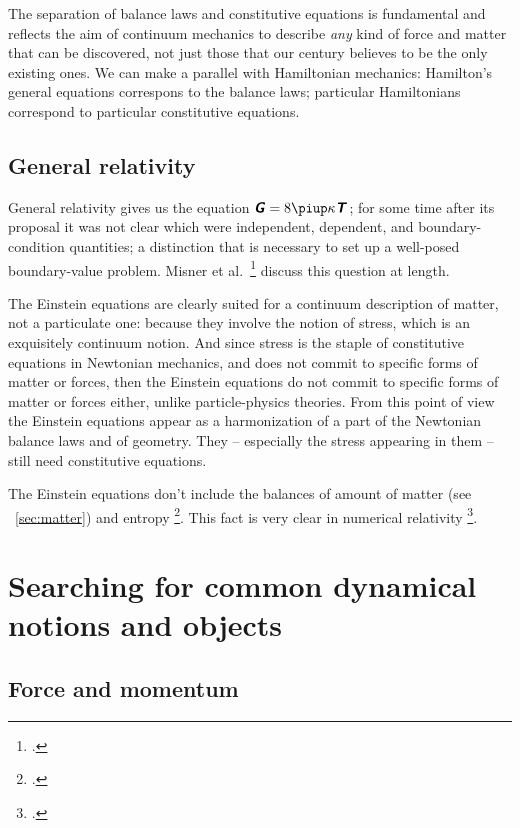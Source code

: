 \documentclass[\ifafour a4paper,12pt,\else a5paper,10pt,\fi%
onecolumn,oneside,article,%
british%
]{memoir}
\theoremstyle{remark}
\theoremstyle{innote}
\newcommand*{\mathte}[1]{\textbf{\textit{\textsf{#1}}}}
\newcommand*{\citep}{\footcites}
\newcommand*{\citey}{\footcites}%
\newcommand*{\pu}{\piup}%
\renewcommand*{\|}[1][]{\nonscript\,#1\vert\nonscript\;\mathopen{}}
\newcommand*{\sect}{\S}%
\newcommand*{\chap}{ch.}%
\newcommand*{\etal}{{et al.}}
\newcommand*{\puzzle}{{\fontencoding{U}\fontfamily{fontawesometwo}\selectfont\symbol{225}}}
\newcommand*{\psect}{{\footnotesize\puzzle}}%
\newcommand*{\yGG}{G}
\newcommand*{\yG}{\mathte{\yGG}}
\newcommand*{\yTTf}{T}
\newcommand*{\yTf}{\mathte{\yTTf}}
\begin{document}
The separation of balance laws and constitutive equations is fundamental
and reflects the aim of continuum mechanics to describe \emph{any} kind of
force and matter that can be discovered, not just those that our century
believes to be the only existing ones. We can make a parallel with
Hamiltonian mechanics: Hamilton's general equations correspons to the
balance laws; particular Hamiltonians correspond to particular constitutive
equations.



\subsection{General relativity}
\label{sec:aims_general_rel}

General relativity gives us the equation $\yG= 8\pu\kappa\yTf$; for some time
after its proposal it was not clear which were independent, dependent, and
boundary-condition quantities; a distinction that is necessary to set up a
well-posed boundary-value problem. Misner \etal\
\citey[\chap~21]{misneretal1970_r1973} discuss this question at length.

The Einstein equations are clearly suited for a continuum description of
matter, not a particulate one: because they involve the notion of stress,
which is an exquisitely continuum notion. And since stress is the staple of
constitutive equations in Newtonian mechanics, and does not commit to
specific forms of matter or forces, then the Einstein equations do not
commit to specific forms of matter or forces either, unlike
particle-physics theories. From this point of view the Einstein equations
appear as a harmonization of a part of the Newtonian balance laws and of
geometry. They -- especially the stress appearing in them -- still need
constitutive equations.

The Einstein equations don't include the balances of amount of matter (see
\psect~\ref{sec:matter}) and entropy
\citep{eckart1940c}[\chap~22]{misneretal1970_r1973}. This fact is very
clear in numerical relativity
\citep[p.~1918]{disconzi2014}[\sect~2.2]{wilsonetal2003_r2007}[\sect~6.3.2]{gourgoulhon2007_r2012}[\chap~5]{baumgarteetal2010}[\sect~2.3]{rezzollaetal2013}.

\section{Searching for common dynamical notions and objects}
\label{sec:search_common_dyn}

\subsection{Force and momentum}
\label{sec:force_momentum}
\end{document}
